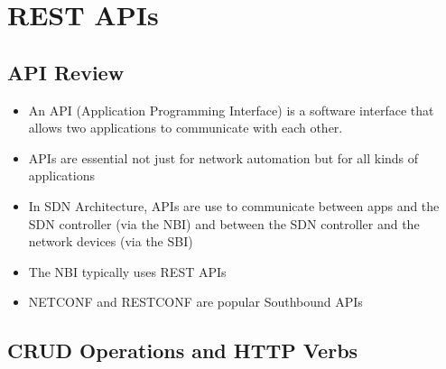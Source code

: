 \chapter{REST APIs}\label{rest-apis}

\section{API Review}\label{api-review}

\begin{itemize}
\tightlist
\item
  An API (Application Programming Interface) is a software interface
  that allows two applications to communicate with each other.
\item
  APIs are essential not just for network automation but for all kinds
  of applications
\item
  In SDN Architecture, APIs are use to communicate between apps and the
  SDN controller (via the NBI) and between the SDN controller and the
  network devices (via the SBI)
\item
  The NBI typically uses REST APIs
\item
  NETCONF and RESTCONF are popular Southbound APIs
\end{itemize}

\section{CRUD Operations and HTTP
Verbs}\label{crud-operations-and-http-verbs}

